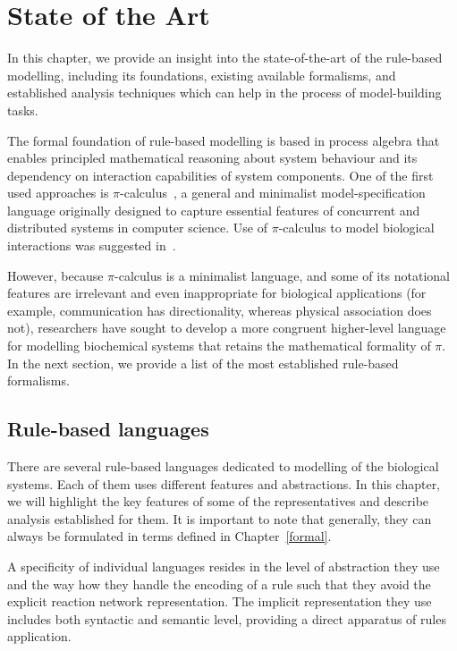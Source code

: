 \documentclass[11pt,a4paper]{report}
\begin{document}
\chapter{State of the Art} \label{chap:state}

In this chapter, we provide an insight into the state-of-the-art of the rule-based modelling, including its foundations, existing available formalisms, and established analysis techniques which can help in the process of model-building tasks.

The formal foundation of rule-based modelling is based in process algebra that enables principled mathematical reasoning about system behaviour and its dependency on interaction capabilities of system components. One of the first used approaches is $\pi$-calculus~\cite{milner1999communicating}, a general and minimalist model-specification language originally designed to capture essential features of concurrent and distributed systems in computer science. Use of $\pi$-calculus to model biological interactions was suggested in~\cite{regev2000representation}.

However, because $\pi$-calculus is a minimalist language, and some of its notational features are irrelevant and even inappropriate for biological applications (for example, communication has directionality, whereas physical association does not), researchers have sought to develop a more congruent higher-level language for
modelling biochemical systems that retains the mathematical formality of $\pi$. In the next section, we provide a list of the most established rule-based formalisms.

\section{Rule-based languages}
\label{rule_based_languages}

There are several rule-based languages dedicated to modelling of the biological systems. Each of them uses different features and abstractions. In this chapter, we will highlight the key features of some of the representatives and describe analysis established for them. It is important to note that generally, they can always be formulated in terms defined in Chapter~\ref{formal}.

A specificity of individual languages resides in the level of abstraction they use and the way how they handle the encoding of a rule such that they avoid the explicit reaction network representation. The implicit representation they use includes both syntactic and semantic level, providing a direct apparatus of rules application.
\end{document}
